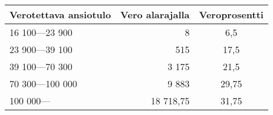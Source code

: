     \centering
    \begin{tabular}{|lrc|}
    \hline
    Verotettava ansiotulo & Vero alarajalla & Veroprosentti \\
    \hline
    16 100—23 900                & 8                             & 6,5                                        \\
    23 900—39 100                & 515                           & 17,5                                       \\
    39 100—70 300                & 3 175                         & 21,5                                       \\
    70 300—100 000                & 9 883                      & 29,75                                      \\
    100 000—                      & 18 718,75                        & 31,75                                     \\
    \hline
    \end{tabular}
